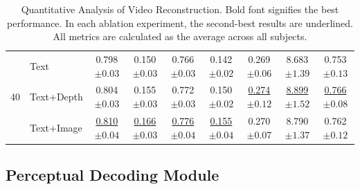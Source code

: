 \documentclass{article}
\begin{document}
\begin{table}[t]
\begin{tabular}{l|l|ccccccc}
    \multirow{3}{*}{40} 
       
        & {Text} &  {{0.798\scriptsize{$\pm0.03$}}} & {0.150\scriptsize{$\pm 0.03$}}&{{0.766\scriptsize{$\pm0.03$}}} & {0.142\scriptsize{$\pm 0.02$}} &{{0.269\scriptsize{$\pm0.06$}}} & {{8.683\scriptsize{$\pm1.39$}}} & {{0.753\scriptsize{$\pm0.13$}}} \\

        & {Text+Depth}  &  {{0.804\scriptsize{$\pm0.03$}}} & {0.155\scriptsize{$\pm 0.03$}}&{{0.772\scriptsize{$\pm0.03$}}} & {0.150\scriptsize{$\pm 0.02$}} &\underline{{0.274\scriptsize{$\pm0.12$}}} & \underline{{8.899\scriptsize{$\pm1.52$}}} & \underline{{0.766\scriptsize{$\pm0.08$}}}  \\
        
        & {Text+Image}   & \underline{{0.810\scriptsize{$\pm0.04$}}} & \underline{0.166\scriptsize{$\pm0.03$}} & \underline{{0.776\scriptsize{$\pm0.04$}}} & \underline{0.155\scriptsize{$\pm0.04$}} & {{0.270\scriptsize{$\pm0.07$}}} & {{8.790\scriptsize{$\pm1.37$}}} & {{0.762\scriptsize{$\pm0.12$}}} \\
        
         
    \bottomrule
\end{tabular}
\caption{Quantitative Analysis of Video Reconstruction. Bold font signifies the best performance. In each ablation experiment, the second-best results are underlined. All metrics are calculated as the average across all subjects.}
\label{tab:cross}
\end{table}

\subsection{Perceptual Decoding Module}
\end{document}
